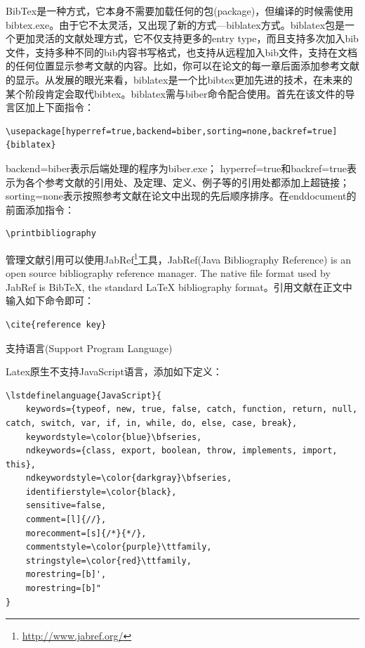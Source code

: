 \documentclass[12pt]{book}
\makeatletter
\numberwithin{dummy}{section}
\theoremstyle{ocrenumbox}
\theoremstyle{blacknumex}
\theoremstyle{blacknumbox}
\theoremstyle{ocrenum}
\renewcommand{\subsection}{\@startsection {subsection}{2}{\z@}
	{-3ex \@plus -0.1ex \@minus -.4ex}
	{0.5ex \@plus.2ex }
	{\normalfont\sffamily\bfseries}}
\makeatother
\begin{document}
BibTex是一种方式，它本身不需要加载任何的包(package)，但编译的时候需使用bibtex.exe。由于它不太灵活，又出现了新的方式—biblatex方式。biblatex包是一个更加灵活的文献处理方式，它不仅支持更多的entry type，而且支持多次加入bib文件，支持多种不同的bib内容书写格式，也支持从远程加入bib文件，支持在文档的任何位置显示参考文献的内容。比如，你可以在论文的每一章后面添加参考文献的显示。从发展的眼光来看，biblatex是一个比bibtex更加先进的技术，在未来的某个阶段肯定会取代bibtex。biblatex需与biber命令配合使用。首先在该文件的导言区加上下面指令：

\begin{lstlisting}[language=Tex]
\usepackage[hyperref=true,backend=biber,sorting=none,backref=true]{biblatex}

\end{lstlisting}

backend=biber表示后端处理的程序为biber.exe；
hyperref=true和backref=true表示为各个参考文献的引用处、及定理、定义、例子等的引用处都添加上超链接；
sorting=none表示按照参考文献在论文中出现的先后顺序排序。在end{document}的前面添加指令：

\begin{lstlisting}[language=Tex]
\printbibliography
\end{lstlisting}

管理文献引用可以使用JabRef\footnote{\url{http://www.jabref.org/}}工具，JabRef(Java Bibliography Reference) is an open source bibliography reference manager. The native file format used by JabRef is BibTeX, the standard LaTeX bibliography format。引用文献在正文中输入如下命令即可：

\begin{lstlisting}[language=Tex]
\cite{reference key}
\end{lstlisting}

\subsection{支持语言(Support Program Language)}

Latex原生不支持JavaScript语言，添加如下定义：

\begin{lstlisting}[language=Tex]
%lstlisting包JavaScript语言设置
\lstdefinelanguage{JavaScript}{
	keywords={typeof, new, true, false, catch, function, return, null, catch, switch, var, if, in, while, do, else, case, break},
	keywordstyle=\color{blue}\bfseries,
	ndkeywords={class, export, boolean, throw, implements, import, this},
	ndkeywordstyle=\color{darkgray}\bfseries,
	identifierstyle=\color{black},
	sensitive=false,
	comment=[l]{//},
	morecomment=[s]{/*}{*/},
	commentstyle=\color{purple}\ttfamily,
	stringstyle=\color{red}\ttfamily,
	morestring=[b]',
	morestring=[b]"
}
\end{lstlisting}
\end{document}
